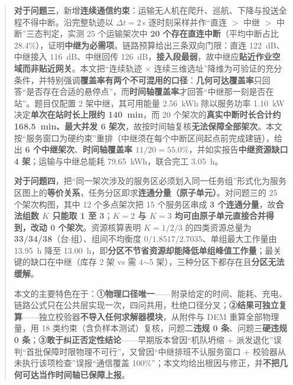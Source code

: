 \begin{abstract}
	\textbf{对于问题三}，新增\textbf{连续通信约束}：运输无人机在爬升、巡航、下降与投送全程不得中断。沿完整轨迹以 $\Delta t=2$\,s 逐时刻采样并作“直连 $>$ 中继 $>$ 中断”三态判定，实测 25 个运输架次中 \textbf{20 个存在直连中断}（平均中断占比 28.4\%），证明\textbf{中继为必需项}。链路预算给出三条双向门限：直连 \SI{122}{dB}、中继接入 \SI{116}{dB}、中继回传 \SI{126}{dB}，\textbf{接入段最弱}，故中继应\textbf{贴近作业空域而非贴近网关}。本文把“连续轨迹 $\times$ 连续三维选址”降维为可验证的充分条件，并特别强调\textbf{覆盖率有两个不可混用的口径}：\textbf{几何可达覆盖率}只回答“是否存在合适的悬停点”，而\textbf{时间轴覆盖率}才回答“中继那一刻是否在站”。题目仅配置 2 架中继，其可用能量 \SI{2.56}{kWh} 除以服务功率 \SI{1.10}{kW} 决定\textbf{单次在站时长上限约 \SI{140}{min}}，而 20 个架次的\textbf{真实中断时长合计约 \SI{168.5}{min}、最大并发 6 架次}，故按时间轴复核\textbf{无法保障全部架次}。本文按“服务窗口为硬约束”重排（中继须在每个中断区间起点前完成建链），给出 \textbf{6 个中继架次}、\textbf{时间轴覆盖率 $11/20=55.0\%$}，并如实报告\textbf{中继资源缺口 4 架}；运输与中继总能耗 \SI{79.65}{kWh}，联合完工 \SI{3.05}{h}。

	\textbf{对于问题四}，把“同一架次涉及的服务区必须划入同一任务组”形式化为服务区图上的\textbf{等价关系}，任务分区即求\textbf{连通分量（原子单元）}。对问题三的 25 个架次构图，其中 12 个多点架次把 15 个服务区串成 \textbf{3 个连通分量}，故\textbf{合法组数 $K$ 只能取 1 至 3}；\textbf{$K=2$ 与 $K=3$ 均可由原子单元直接合并得到，改动 0 个架次}。资源核算表明 $K=1/2/3$ 的四类资源总量为 \textbf{33/34/38}（台$\cdot$组）、组间不均衡度 $0/1.8517/2.7035$、单组最大工作量由 \SI{13.95}{h} 降至 \SI{13.00}{h}，即\textbf{分区不节省资源却能降低单组峰值工作量}；最关键的缺口在中继（库存 2 架 vs 需 4$\sim$5 架），三种分区下都存在且\textbf{分区无法缓解}。

	本文的主要特色在于：\textbf{①物理口径唯一}——附录给定的时间、能耗、充电、链路公式只在公共层实现一次，四问共用，杜绝口径分叉；\textbf{②结果可独立复算}——独立校验器\textbf{不导入任何求解器模块}，从附件与 DEM 重算全部物理量，用 18 类约束（含负样本测试）复核，问题二\textbf{违规 0 条}、问题三\textbf{硬违规 0 条}；\textbf{③敢于纠正否定性结论}——早期版本曾因“机队坍缩 $+$ 派发退化”误判“首批保障时限物理不可行”，又曾因“中继排班不认服务窗口 $+$ 校验器从未执行该项检查”误报“通信覆盖 100\%”；本文均给出根因与修正，并\textbf{不把几何可达当作时间轴已保障上报}。

\end{abstract}
